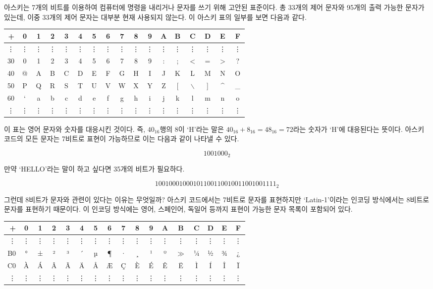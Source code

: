 \documentclass{article}
\begin{document}
아스키는 7개의 비트를 이용하여 컴퓨터에 명령을 내리거나 문자를 쓰기 위해 고안된 표준이다.
총 33개의 제어 문자와 95개의 출력 가능한 문자가 있는데, 이중 33개의 제어 문자는 대부분 현재
사용되지 않는다. 이 아스키 표의 일부를 보면 다음과 같다.

\begin{center}
    \begin{tabular}{r|cccccccccccccccc}
        + & 0 & 1 & 2 & 3 & 4 & 5 & 6 & 7 & 8 & 9 & A & B & C & D & E & F \\
        \hline
        \vdots & \vdots & \vdots & \vdots & \vdots & \vdots & \vdots & \vdots & \vdots & \vdots & \vdots & \vdots & \vdots & \vdots & \vdots & \vdots & \vdots \\
        30 & 0 & 1 & 2 & 3 & 4 & 5 & 6 & 7 & 8 & 9 & : & ; & $<$ & = & $>$ & ? \\
        40 & @ & A & B & C & D & E & F & G & H & I & J & K & L & M & N & O \\
        50 & P & Q & R & S & T & U & V & W & X & Y & Z & [ & $\backslash$ & ] & \^{} & \_{} \\
        60 & ` & a & b & c & d & e & f & g & h & i & j & k & l & m & n & o \\
        \vdots & \vdots & \vdots & \vdots & \vdots & \vdots & \vdots & \vdots & \vdots & \vdots & \vdots & \vdots & \vdots & \vdots & \vdots & \vdots & \vdots
    \end{tabular}
\end{center}

이 표는 영어 문자와 숫자를 대응시킨 것이다. 즉, $40_{16}$행의 8이 `H'라는 말은
$40_{16}+8_{16} = 48_{16} = 72$라는
숫자가 `H'에 대응된다는 뜻이다. 아스키 코드의 모든 문자는 7비트로 표현이 가능하므로 이는 다음과
같이 나타낼 수 있다.

$$
1001000_2
$$

만약 `HELLO'라는 말이 하고 싶다면 35개의 비트가 필요하다.

$$
1001000 1000101 1001100 1001100 1001111 _2
$$

그런데 8비트가 문자와 관련이 있다는 이유는 무엇일까?
아스키 코드에서는 7비트로 문자를 표현하지만 `Latin-1'이라는 인코딩 방식에서는 8비트로 문자를
표현하기 때문이다. 이 인코딩 방식에는 영어, 스페인어, 독일어 등까지 표현이 가능한 문자 목록이
포함되어 있다.

\begin{center}
    \begin{tabular}{r|cccccccccccccccc}
        + & 0 & 1 & 2 & 3 & 4 & 5 & 6 & 7 & 8 & 9 & A & B & C & D & E & F \\
        \hline
        \vdots & \vdots & \vdots & \vdots & \vdots & \vdots & \vdots & \vdots & \vdots & \vdots & \vdots & \vdots & \vdots & \vdots & \vdots & \vdots & \vdots \\
        B0 & ° & ± & ² & ³ & ´ & µ & ¶ & · & ¸ & ¹ & º & $\gg$ & ¼ & ½ & ¾ & ¿ \\
        C0 & À & Á & Â & Ã & Ä & Å & Æ & Ç & È & É & Ê & Ë & Ì & Í & Î & Ï \\
        \vdots & \vdots & \vdots & \vdots & \vdots & \vdots & \vdots & \vdots & \vdots & \vdots & \vdots & \vdots & \vdots & \vdots & \vdots & \vdots & \vdots
    \end{tabular}
\end{center}
\end{document}
